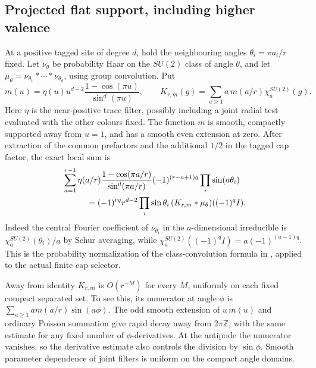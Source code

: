 \subsection{Projected flat support, including higher valence}
\label{phase:support}

At a positive tagged site of degree \(d\), hold the neighbouring angles \(\theta_i=\pi a_i/r\) fixed. Let \(\nu_\theta\) be probability Haar on the \(SU(2)\) class of angle \(\theta\), and let \(\mu_\theta=\nu_{\theta_1}*\cdots*\nu_{\theta_d}\), using group convolution. Put
\[
 m(u)=\eta(u)u^{d-2}\frac{1-\cos(\pi u)}{\sin^d(\pi u)},\qquad
 K_{r,m}(g)=\sum_{a\ge1} a\,m(a/r)\chi_a^{SU(2)}(g).
\]
Here \(\eta\) is the near-positive trace filter, possibly including a joint radial test evaluated with the other colours fixed. The function \(m\) is smooth, compactly supported away from \(u=1\), and has a smooth even extension at zero. After extraction of the common prefactors and the additional \(1/2\) in the tagged cap factor, the exact local sum is
\begin{align}
 &\sum_{a=1}^{r-1}\eta(a/r)\frac{1-\cos(\pi a/r)}{\sin^d(\pi a/r)}
           (-1)^{(r-a+1)q}\prod_i\sin(a\theta_i) \nonumber\\
 &\hspace{10mm}=
   (-1)^{rq}r^{d-2}\prod_i\sin\theta_i\,
                  (K_{r,m}*\mu_\theta)((-1)^q I).
 \label{phase:convolution}
\end{align}
Indeed the central Fourier coefficient of \(\nu_{\theta_i}\) in the \(a\)-dimensional irreducible is \(\chi_a^{SU(2)}(\theta_i)/a\) by Schur averaging, while \(\chi_a^{SU(2)}((-1)^q I)=a(-1)^{(a-1)q}\). This is the probability normalization of the class-convolution formula in \cite[(29)--(32)]{AMW}, applied to the actual finite cap selector.

Away from identity \(K_{r,m}\) is \(O(r^{-M})\) for every \(M\), uniformly on each fixed compact separated set. To see this, its numerator at angle \(\phi\) is \(\sum_{a\ge1} a m(a/r)\sin(a\phi)\). The odd smooth extension of \(u\,m(u)\) and ordinary Poisson summation give rapid decay away from \(2\pi\mathbb Z\), with the same estimate for any fixed number of \(\phi\)-derivatives. At the antipode the numerator vanishes, so the derivative estimate also controls the division by \(\sin\phi\). Smooth parameter dependence of joint filters is uniform on the compact angle domains.

